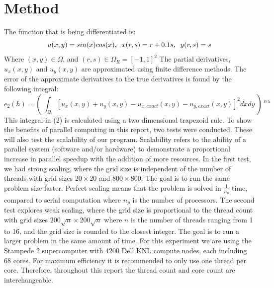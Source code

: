 \documentclass[12pt]{article}
\begin{document}
	\section{Method}
	The function that is being differentiated is:
	\begin{equation}
		u(x,y)=sin(x)cos(x), \hspace{2mm} x(r,s)=r+0.1s,\hspace{2mm} y(r,s)=s
	\end{equation}
	Where $(x,y)\in \Omega$, and $(r,s)\in \Omega_R=[-1,1]^2$
	\newline
	\newline
	The partial derivatives, $u_x(x,y)$ and $u_y(x,y)$ are approximated using finite difference methods. The error of the approximate derivatives to the true derivatives is found by the following integral:
	\newline
	\begin{equation}
		e_2(h)=(\ \int_\Omega \![u_x(x,y)+u_y(x,y)-u_{x,exact}(x,y)-u_{y,exact}(x,y)]^2dxdy\ )\ ^{0.5}
	\end{equation}
	This integral in (2) is calculated using a two dimensional trapezoid rule.
	\newline \newline
		To show the benefits of parallel computing in this report, two tests were conducted. These will also test the scalability of our program. Scalability refers to the ability of a parallel system (software and/or hardware) to demonstrate a proportional increase in parallel speedup with the addition of more resources.
		 In the first test, we had strong scaling, where the grid size is independent of the number of threads with grid sizes $20 \times 20$ and $800 \times 800$. The goal is to run the same problem size faster. Perfect scaling means that the problem is solved in $\frac{1}{n_p}$ time, compared to serial computation where $n_p$ is the number of processors. The second test explores weak scaling, where the grid size is proportional to the thread count with grid sizes $200 \sqrt{n} \times 200 \sqrt{n}$ where $n$ is the number of threads ranging from 1 to 16, and the grid size is rounded to the closest integer. The goal is to run a larger problem in the same amount of time. For this experiment we are using the Stampede 2 supercomputer with 4200 Dell KNL compute nodes, each including 68 cores. For maximum efficiency it is recommended to only use one thread per core. Therefore, throughout this report the thread count and core count are interchangeable. 
	\newline\newline
\end{document}
